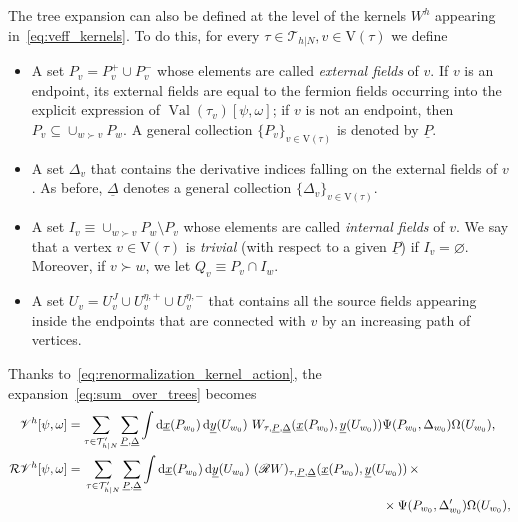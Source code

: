 \documentclass[a4paper, 11pt]{article}
\newcommand{\sing}[2]{{#1}^{#2}}							%
\newcommand{\ren}{\mathcal{R}}								%
\newcommand{\kren}{\mathscr{R}}								%
\newcommand{\vrt}{\mathrm{V}}								%
\newcommand{\trees}{\mathcal{T}}							%
\newcommand{\Src}{\Omega}
\DeclareMathOperator{\val}{Val}								%
\theoremstyle{thm}
\begin{document}
The tree expansion can also be defined at the level of the kernels $\sing{W}{h}$ appearing in~\eqref{eq:veff_kernels}. To do this, for every $\tau \in \trees_{h|N}, v \in \vrt(\tau)$ we define
\begin{itemize}
\item A set $P_v = P_v^+ \cup P_v^-$ whose elements are called \emph{external fields} of $v$. If $v$ is an endpoint, its external fields are equal to the fermion fields occurring into the explicit expression of $\val(\tau_v)[\psi, \omega]$; if $v$ is not an endpoint, then $P_v \subseteq \cup_{w \succ v} P_w$. A general collection $\lbrace P_v \rbrace_{v \in \vrt(\tau)}$ is denoted by $\underline{P}$.
\item A set $\Delta_v$ that contains the derivative indices falling on the external fields of $v$. As before, $\underline{\Delta}$ denotes a general collection $\lbrace \Delta_v \rbrace_{v \in \vrt(\tau)}$.
\item A set $I_v \equiv \cup_{w \succ v} P_w \setminus P_v$ whose elements are called \emph{internal fields} of $v$. We say that a vertex $v \in \vrt(\tau)$ is \emph{trivial} (with respect to a given $\underline{P}$) if $I_v = \varnothing$. Moreover, if $v \succ w$, we let $Q_v \equiv P_v \cap I_w$.
\item A set $U_v = U^J_v \cup U^{\eta, +}_v \cup U^{\eta, -}_v$ that contains all the source fields appearing inside the endpoints that are connected with $v$ by an increasing path of vertices.
\end{itemize}
Thanks to~\eqref{eq:renormalization_kernel_action}, the expansion~\eqref{eq:sum_over_trees} becomes
\begin{align}
\label{eq:sum_over_trees_P}
\begin{split}
\sing{\mathscr{V}}{h}[\psi, \omega] & = \sum_{\tau \in \trees_{h|N}'} \sum_{\underline{P}, \underline{\Delta}} \int \dd{\underline{x}(P_{w_0})} \dd{\underline{y}(U_{w_0})} \, W_{\tau, \underline{P}, \underline{\Delta}}(\underline{x}(P_{w_0}), \underline{y}(U_{w_0})) \Psi(P_{w_0}, \Delta_{w_0}) \Src(U_{w_0}), \\
\ren \sing{\mathscr{V}}{h}[\psi, \omega] & =
\begin{multlined}[t]
\sum_{\tau \in \trees_{h|N}'} \sum_{\underline{P}, \underline{\Delta}} \int \dd{\underline{x}(P_{w_0})} \dd{\underline{y}(U_{w_0})} \, (\kren W)_{\tau, \underline{P}, \underline{\Delta}}(\underline{x}(P_{w_0}), \underline{y}(U_{w_0})) \, \times \\
\hspace*{8cm} \times \Psi(P_{w_0}, \Delta'_{w_0}) \Src(U_{w_0}),
\end{multlined}
\end{split}
\end{align}
\end{document}
